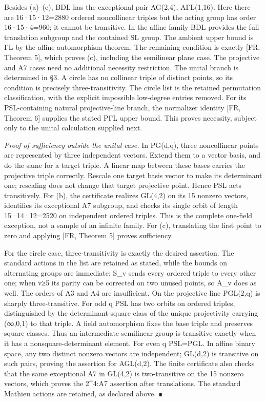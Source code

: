 \documentclass[
  11pt,
  a4paper,
]{article}
\begin{document}
Besides (a)--(e), BDL has the exceptional pair AG(2,4), AΓL(1,16). Here
there are 16·15·12=2880 ordered noncollinear triples but the acting
group has order 16·15·4=960; it cannot be transitive. In the affine
family BDL provides the full translation subgroup and the contained SL
group. The ambient upper bound is ΓL by the affine automorphism theorem.
The remaining condition is exactly {[}FR, Theorem 5{]}, which proves
(c), including the semilinear plane case. The projective and A7 cases
need no additional necessity restriction. The unital branch is
determined in §3. A circle has no collinear triple of distinct points,
so its condition is precisely three-transitivity. The circle list is the
retained permutation classification, with the explicit impossible
low-degree entries removed. For its PSL-containing natural
projective-line branch, the normalizer identity {[}FR, Theorem 6{]}
supplies the stated PΓL upper bound. This proves necessity, subject only
to the unital calculation supplied next.

\emph{Proof of sufficiency outside the unital case.} In PG(d,q), three
noncollinear points are represented by three independent vectors. Extend
them to a vector basis, and do the same for a target triple. A linear
map between these bases carries the projective triple correctly. Rescale
one target basis vector to make its determinant one; rescaling does not
change that target projective point. Hence PSL acts transitively. For
(b), the certificate realizes GL(4,2) on its 15 nonzero vectors,
identifies its exceptional A7 subgroup, and checks its single orbit of
length 15·14·12=2520 on independent ordered triples. This is the
complete one-field exception, not a sample of an infinite family. For
(c), translating the first point to zero and applying {[}FR, Theorem
5{]} proves sufficiency.

For the circle case, three-transitivity is exactly the desired
assertion. The standard actions in the list are retained as stated,
while the bounds on alternating groups are immediate: S\_v sends every
ordered triple to every other one; when v≥5 its parity can be corrected
on two unused points, so A\_v does as well. The orders of A3 and A4 are
insufficient. On the projective line PGL(2,q) is sharply
three-transitive. For odd q PSL has two orbits on ordered triples,
distinguished by the determinant-square class of the unique projectivity
carrying (∞,0,1) to that triple. A field automorphism fixes the base
triple and preserves square classes. Thus an intermediate semilinear
group is transitive exactly when it has a nonsquare-determinant element.
For even q PSL=PGL. In affine binary space, any two distinct nonzero
vectors are independent; GL(d,2) is transitive on such pairs, proving
the assertion for AGL(d,2). The finite certificate also checks that the
same exceptional A7 in GL(4,2) is two-transitive on the 15 nonzero
vectors, which proves the 2\^{}4:A7 assertion after translations. The
standard Mathieu actions are retained, as declared above. ∎
\end{document}
